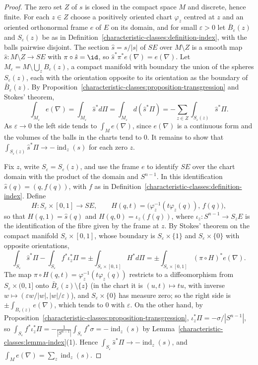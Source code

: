 \begin{proof}
The zero set $Z$ of $s$ is closed in the compact space $M$ and discrete, hence finite. For each $z \in Z$ choose a positively oriented chart $\varphi_z$ centred at $z$ and an oriented
orthonormal frame $e$ of $E$ on its domain, and for small $\varepsilon > 0$ let $\bar B_\varepsilon(z)$ and $S_\varepsilon(z)$ be as in Definition~\ref{characteristic-classes:definition-index},
with the balls pairwise disjoint. The section $\hat s = s/|s|$ of $SE$ over $M \setminus Z$ is a smooth map $\hat s \colon M \setminus Z \to SE$ with $\pi \circ \hat s = \id$, so
$\hat s^*\pi^*e(\nabla) = e(\nabla)$. Let $M_\varepsilon = M \setminus \bigcup_zB_\varepsilon(z)$, a compact manifold with boundary the union of the spheres $S_\varepsilon(z)$, each with the
orientation opposite to its orientation as the boundary of $\bar B_\varepsilon(z)$. By Proposition~\ref{characteristic-classes:proposition-transgression} and Stokes' theorem,
\[
\int_{M_\varepsilon}e(\nabla) = \int_{M_\varepsilon}\hat s^*d\Pi = \int_{M_\varepsilon}d(\hat s^*\Pi) = -\sum_{z \in Z}\int_{S_\varepsilon(z)}\hat s^*\Pi .
\]
As $\varepsilon \to 0$ the left side tends to $\int_Me(\nabla)$, since $e(\nabla)$ is a continuous form and the volumes of the balls in the charts tend to $0$. It remains to show that
$\int_{S_\varepsilon(z)}\hat s^*\Pi \to -\operatorname{ind}_z(s)$ for each zero $z$.

Fix $z$, write $S_\varepsilon = S_\varepsilon(z)$, and use the frame $e$ to identify $SE$ over the chart domain with the product of the domain and $S^{n-1}$. In this identification
$\hat s(q) = (q, f(q))$, with $f$ as in Definition~\ref{characteristic-classes:definition-index}. Define
\[
H \colon S_\varepsilon \times [0, 1] \to SE, \qquad H(q, t) = \bigl(\varphi_z^{-1}(t\varphi_z(q)),\, f(q)\bigr),
\]
so that $H(q, 1) = \hat s(q)$ and $H(q, 0) = \iota_z(f(q))$, where $\iota_z \colon S^{n-1} \to S_zE$ is the identification of the fibre given by the frame at $z$. By Stokes' theorem on the
compact manifold $S_\varepsilon \times [0, 1]$, whose boundary is $S_\varepsilon \times \{1\}$ and $S_\varepsilon \times \{0\}$ with opposite orientations,
\[
\int_{S_\varepsilon}\hat s^*\Pi - \int_{S_\varepsilon}f^*\iota_z^*\Pi = \pm\int_{S_\varepsilon \times [0, 1]}H^*d\Pi = \pm\int_{S_\varepsilon \times [0, 1]}(\pi \circ H)^*e(\nabla) .
\]
The map $\pi \circ H(q, t) = \varphi_z^{-1}(t\varphi_z(q))$ restricts to a diffeomorphism from $S_\varepsilon \times (0, 1]$ onto $\bar B_\varepsilon(z) \setminus \{z\}$ (in the chart it is
$(u, t) \mapsto tu$, with inverse $w \mapsto (\varepsilon w/|w|, |w|/\varepsilon)$), and $S_\varepsilon \times \{0\}$ has measure zero; so the right side is $\pm\int_{B_\varepsilon(z)}e(\nabla)$,
which tends to $0$ with $\varepsilon$. On the other hand, by Proposition~\ref{characteristic-classes:proposition-transgression}, $\iota_z^*\Pi = -\sigma/|S^{n-1}|$, so
$\int_{S_\varepsilon}f^*\iota_z^*\Pi = -\frac{1}{|S^{n-1}|}\int_{S_\varepsilon}f^*\sigma = -\operatorname{ind}_z(s)$ by Lemma~\ref{characteristic-classes:lemma-index}(1). Hence
$\int_{S_\varepsilon}\hat s^*\Pi \to -\operatorname{ind}_z(s)$, and $\int_Me(\nabla) = \sum_z\operatorname{ind}_z(s)$.
\end{proof}

